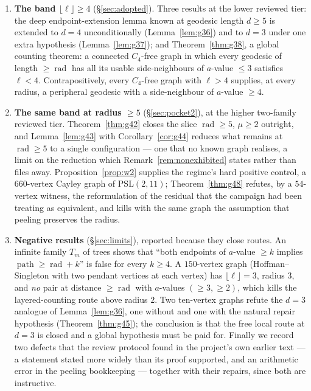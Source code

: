 \documentclass[11pt]{article}
\theoremstyle{plain}
\theoremstyle{definition}
\theoremstyle{remark}
\numberwithin{equation}{section}
\newcommand{\rad}{\operatorname{rad}}
\newcommand{\pth}{\operatorname{path}}
\begin{document}
\begin{enumerate}
\item \textbf{The band $\lfloor\ell\rfloor \ge 4$} (\S\ref{sec:adopted}). Three results at the
lower reviewed tier: the deep endpoint-extension lemma known at geodesic length $d \ge 5$ is
extended to $d = 4$ unconditionally (Lemma~\ref{lem:g36}) and to $d = 3$ under one extra
hypothesis (Lemma~\ref{lem:g37}); and Theorem~\ref{thm:g38}, a global counting theorem: a
connected $C_4$-free graph in which every geodesic of length $\ge \rad$ has all its usable
side-neighbours of $a$-value $\le 3$ satisfies $\ell < 4$. Contrapositively, every $C_4$-free
graph with $\ell > 4$ supplies, at every radius, a peripheral geodesic with a side-neighbour
of $a$-value $\ge 4$.

\item \textbf{The same band at radius $\ge 5$} (\S\ref{sec:pocket2}), at the higher
two-family reviewed tier. Theorem~\ref{thm:g42} closes the slice $\rad \ge 5$,
$\mu \ge 2$ outright, and Lemma~\ref{lem:g43} with Corollary~\ref{cor:g44} reduces what
remains at $\rad \ge 5$ to a single configuration --- one that no known graph realises, a
limit on the reduction which Remark~\ref{rem:nonexhibited} states rather than files away.
Proposition~\ref{prop:w2} supplies the regime's hard positive control, a $660$-vertex Cayley
graph of $\mathrm{PSL}(2,11)$; Theorem~\ref{thm:g48} refutes, by a $54$-vertex witness, the
reformulation of the residual that the campaign had been treating as equivalent, and kills
with the same graph the assumption that peeling preserves the radius.

\item \textbf{Negative results} (\S\ref{sec:limits}), reported because they close routes.
An infinite family $T_m$ of trees shows that ``both endpoints of $a$-value $\ge k$ implies
$\pth \ge \rad + k$'' is false for every $k \ge 4$. A $150$-vertex graph (Hoffman--Singleton
with two pendant vertices at each vertex) has $\lfloor\ell\rfloor = 3$, radius $3$, and
\emph{no} pair at distance $\ge \rad$ with $a$-values $(\ge 3, \ge 2)$, which kills the
layered-counting route above radius $2$. Two ten-vertex graphs refute the $d = 3$ analogue of
Lemma~\ref{lem:g36}, one without and one with the natural repair hypothesis
(Theorem~\ref{thm:g45}); the conclusion is that the free local route at $d = 3$ is closed and
a global hypothesis must be paid for. Finally we record two defects that the review protocol
found in the project's own earlier text --- a statement stated more widely than its proof
supported, and an arithmetic error in the peeling bookkeeping --- together with their
repairs, since both are instructive.
\end{enumerate}
\end{document}

